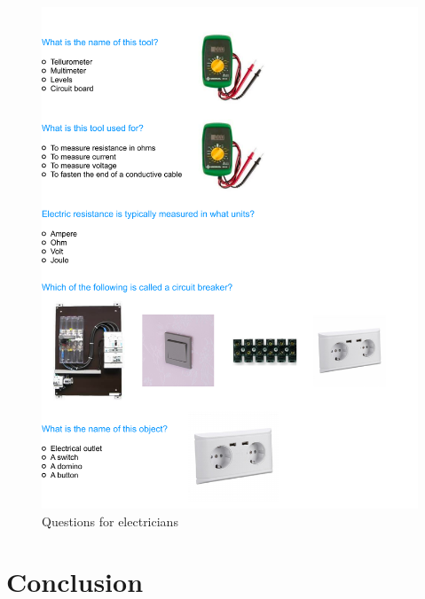 \documentclass[
  a4paper, twoside, 12pt]{book}
\newcommand{\newsection}{\setcounter{figure}{0}
\renewcommand{\thefigure}{\arabic{chapter}.\arabic{figure}}
\setcounter{table}{0}
\renewcommand{\thetable}{\arabic{chapter}.\arabic{table}}}
\begin{document}
\begin{singlespacing}
\begin{figure}[H]
\includegraphics{figures/questionnaire/electricians} \caption{\label{fig:qs_electricians}Questions for electricians}\label{fig:unnamed-chunk-10}
\end{figure}
\end{singlespacing}

\renewcommand{\thesection}{\arabic{chapter}.\arabic{section}}
\setcounter{section}{0}
\renewcommand{\thesubsection}{\arabic{chapter}.\arabic{section}.\arabic{subsection}}
\setcounter{subsection}{0}

\newsection

\chapter{Conclusion}
\end{document}
